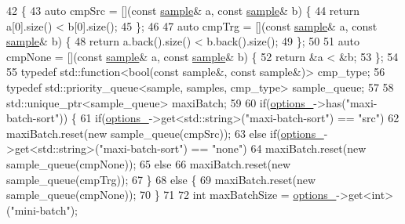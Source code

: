 \begin{DoxyCode}
42                                         \{
43     \textcolor{keyword}{auto} cmpSrc = [](\textcolor{keyword}{const} \hyperlink{classmarian_1_1data_1_1BatchGenerator_a6c7a80f1880a4ff6bfd3c99cef335855}{sample}& a, \textcolor{keyword}{const} \hyperlink{classmarian_1_1data_1_1BatchGenerator_a6c7a80f1880a4ff6bfd3c99cef335855}{sample}& b) \{
44       \textcolor{keywordflow}{return} a[0].size() < b[0].size();
45     \};
46 
47     \textcolor{keyword}{auto} cmpTrg = [](\textcolor{keyword}{const} \hyperlink{classmarian_1_1data_1_1BatchGenerator_a6c7a80f1880a4ff6bfd3c99cef335855}{sample}& a, \textcolor{keyword}{const} \hyperlink{classmarian_1_1data_1_1BatchGenerator_a6c7a80f1880a4ff6bfd3c99cef335855}{sample}& b) \{
48       \textcolor{keywordflow}{return} a.back().size() < b.back().size();
49     \};
50 
51     \textcolor{keyword}{auto} cmpNone = [](\textcolor{keyword}{const} \hyperlink{classmarian_1_1data_1_1BatchGenerator_a6c7a80f1880a4ff6bfd3c99cef335855}{sample}& a, \textcolor{keyword}{const} \hyperlink{classmarian_1_1data_1_1BatchGenerator_a6c7a80f1880a4ff6bfd3c99cef335855}{sample}& b) \{
52       \textcolor{keywordflow}{return} &a < &b;
53     \};
54 
55     \textcolor{keyword}{typedef} std::function<bool(const sample&, const sample&)> cmp\_type;
56     \textcolor{keyword}{typedef} std::priority\_queue<sample, samples, cmp\_type> sample\_queue;
57 
58     std::unique\_ptr<sample\_queue> maxiBatch;
59 
60     \textcolor{keywordflow}{if}(\hyperlink{classmarian_1_1data_1_1BatchGenerator_a8569748b3bca0d5f30e6e2f4def1b535}{options\_}->has(\textcolor{stringliteral}{"maxi-batch-sort"})) \{
61       \textcolor{keywordflow}{if}(\hyperlink{classmarian_1_1data_1_1BatchGenerator_a8569748b3bca0d5f30e6e2f4def1b535}{options\_}->get<std::string>(\textcolor{stringliteral}{"maxi-batch-sort"}) == \textcolor{stringliteral}{"src"})
62         maxiBatch.reset(\textcolor{keyword}{new} sample\_queue(cmpSrc));
63       \textcolor{keywordflow}{else} \textcolor{keywordflow}{if}(\hyperlink{classmarian_1_1data_1_1BatchGenerator_a8569748b3bca0d5f30e6e2f4def1b535}{options\_}->get<std::string>(\textcolor{stringliteral}{"maxi-batch-sort"}) == \textcolor{stringliteral}{"none"})
64         maxiBatch.reset(\textcolor{keyword}{new} sample\_queue(cmpNone));
65       \textcolor{keywordflow}{else}
66         maxiBatch.reset(\textcolor{keyword}{new} sample\_queue(cmpTrg));
67     \}
68     \textcolor{keywordflow}{else} \{
69       maxiBatch.reset(\textcolor{keyword}{new} sample\_queue(cmpNone));
70     \}
71 
72     \textcolor{keywordtype}{int} maxBatchSize = \hyperlink{classmarian_1_1data_1_1BatchGenerator_a8569748b3bca0d5f30e6e2f4def1b535}{options\_}->get<\textcolor{keywordtype}{int}>(\textcolor{stringliteral}{"mini-batch"});

\end{DoxyCode}
